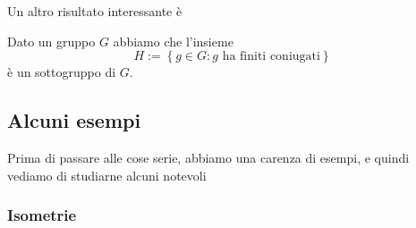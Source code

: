 \documentclass[11pt]{scrartcl}
\begin{document}
	Un altro risultato interessante è 
	\begin{proposition}
		Dato un gruppo $G$ abbiamo che l'insieme 
		$$H:=\left\{g\in G: \text{$g$ ha finiti coniugati}\right\}$$
		è un sottogruppo di $G$.
	\end{proposition}
	
	\subsection{Alcuni esempi}
	
	Prima di passare alle cose serie, abbiamo una carenza di esempi, e quindi vediamo di studiarne alcuni notevoli
	\subsubsection{Isometrie}
	
\end{document}
